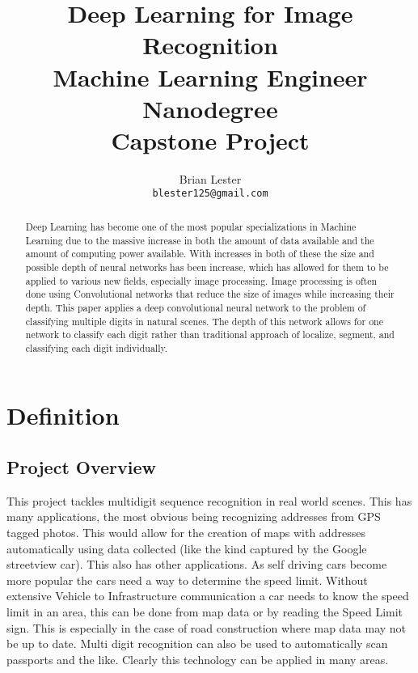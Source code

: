 \documentclass[12pt,twocolumn,letterpaper]{article}
\begin{document}
\title{{\huge Deep Learning for Image Recognition} \\
Machine Learning Engineer Nanodegree \\
Capstone Project}

\author{Brian Lester\\
{\tt\small blester125@gmail.com}}

\maketitle

\begin{abstract}
   Deep Learning has become one of the most popular specializations in Machine 
   Learning due to the massive increase in both the amount of data available and 
   the amount of computing power available. With increases in both of these the 
   size and possible depth of neural networks has been increase, which has allowed for 
   them to be applied to various new fields, especially image processing. Image
   processing is often done using Convolutional networks that reduce the size of
   images while increasing their depth. This paper applies a deep convolutional 
   neural network to the problem of classifying multiple digits in natural 
   scenes. The depth of this network allows for one network to classify each 
   digit rather than traditional approach of localize, segment, and classifying 
   each digit individually. 
\end{abstract}

\section{Definition}
\subsection{Project Overview}
This project tackles multidigit sequence recognition in real world scenes. This 
has many applications, the most obvious being recognizing addresses from GPS 
tagged photos. This would allow for the creation of maps with addresses 
automatically using data collected (like the kind captured by the Google streetview car). 
This also has other applications. As self driving cars become more popular the 
cars need a way to determine the speed limit. Without extensive Vehicle to 
Infrastructure communication a car needs to know the speed limit in an area, this 
can be done from map data or by reading the Speed Limit sign. This is especially 
in the case of road construction where map data may not be up to date. Multi digit 
recognition can also be used to automatically scan passports and the like. 
Clearly this technology can be applied in many areas.
\end{document}
